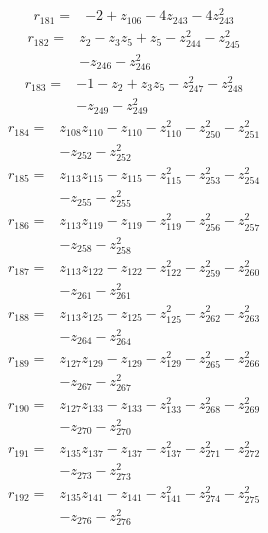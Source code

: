 \begin{align*}
r_{181}={}&-2 +z_{106} -4z_{243} -4z_{243}^{2}
\end{align*}
\begin{align*}
r_{182}={}&z_{2} -z_{3}z_{5} +z_{5} -z_{244}^{2} -z_{245}^{2}\\
&-z_{246} -z_{246}^{2}
\end{align*}
\begin{align*}
r_{183}={}&-1 -z_{2} +z_{3}z_{5} -z_{247}^{2} -z_{248}^{2}\\
&-z_{249} -z_{249}^{2}
\end{align*}
\begin{align*}
r_{184}={}&z_{108}z_{110} -z_{110} -z_{110}^{2} -z_{250}^{2} -z_{251}^{2}\\
&-z_{252} -z_{252}^{2}
\end{align*}
\begin{align*}
r_{185}={}&z_{113}z_{115} -z_{115} -z_{115}^{2} -z_{253}^{2} -z_{254}^{2}\\
&-z_{255} -z_{255}^{2}
\end{align*}
\begin{align*}
r_{186}={}&z_{113}z_{119} -z_{119} -z_{119}^{2} -z_{256}^{2} -z_{257}^{2}\\
&-z_{258} -z_{258}^{2}
\end{align*}
\begin{align*}
r_{187}={}&z_{113}z_{122} -z_{122} -z_{122}^{2} -z_{259}^{2} -z_{260}^{2}\\
&-z_{261} -z_{261}^{2}
\end{align*}
\begin{align*}
r_{188}={}&z_{113}z_{125} -z_{125} -z_{125}^{2} -z_{262}^{2} -z_{263}^{2}\\
&-z_{264} -z_{264}^{2}
\end{align*}
\begin{align*}
r_{189}={}&z_{127}z_{129} -z_{129} -z_{129}^{2} -z_{265}^{2} -z_{266}^{2}\\
&-z_{267} -z_{267}^{2}
\end{align*}
\begin{align*}
r_{190}={}&z_{127}z_{133} -z_{133} -z_{133}^{2} -z_{268}^{2} -z_{269}^{2}\\
&-z_{270} -z_{270}^{2}
\end{align*}
\begin{align*}
r_{191}={}&z_{135}z_{137} -z_{137} -z_{137}^{2} -z_{271}^{2} -z_{272}^{2}\\
&-z_{273} -z_{273}^{2}
\end{align*}
\begin{align*}
r_{192}={}&z_{135}z_{141} -z_{141} -z_{141}^{2} -z_{274}^{2} -z_{275}^{2}\\
&-z_{276} -z_{276}^{2}
\end{align*}
